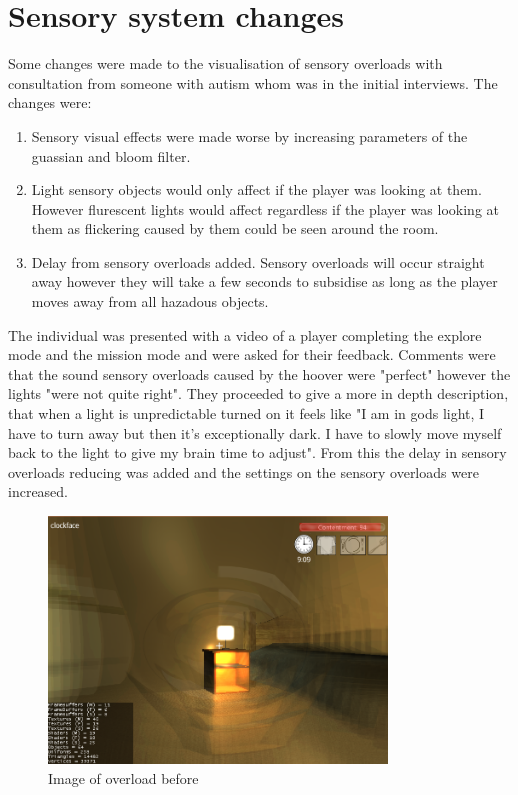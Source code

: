 \documentclass[11pt]{report}
\begin{document}
\section{Sensory system changes}
Some changes were made to the visualisation of sensory overloads with consultation from someone with autism whom was in the initial interviews. The changes were:
\begin{enumerate}
\item Sensory visual effects were made worse by increasing parameters of the guassian and bloom filter.
\item Light sensory objects would only affect if the player was looking at them. However flurescent lights would affect regardless if the player was looking at them as flickering caused by them could be seen around the room.
\item Delay from sensory overloads added. Sensory overloads will occur straight away however they will take a few seconds to subsidise as long as the player moves away from all hazadous objects. 
\end{enumerate}

The individual was presented with a video of a player completing the explore mode and the mission mode and were asked for their feedback. Comments were that the sound sensory overloads caused by the hoover were "perfect" however the lights "were not quite right". They proceeded to give a more in depth description, that when a light is unpredictable turned on it feels like "I am in gods light, I have to turn away but then it's exceptionally dark. I have to slowly move myself back to the light to give my brain time to adjust". From this the delay in sensory overloads reducing was added and the settings on the sensory overloads were increased.

\begin{figure}[H]
\centering
\includegraphics[width=90mm]{images/implementationfirst/gameimages/overloadbedroom_beforeconsultation.png}
\caption{Image of overload before}
\label{old_house}
\end{figure}
\end{document}
